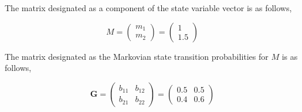 \documentclass{article}
\begin{document}
\noindent The matrix designated as a component of the state variable vector is as follows,

\begin{equation}
M=\begin{pmatrix}
m_1\\m_2
\end{pmatrix}=
\begin{pmatrix}
1\\1.5
\end{pmatrix}
\end{equation}

\noindent The matrix designated as the Markovian state transition probabilities for $M$ is as follows,

\begin{equation}
\mathbf{G}=\begin{pmatrix}
b_{11} & b_{12} \\
b_{21} & b_{22}
\end{pmatrix}=
\begin{pmatrix}
0.5 & 0.5 \\
0.4 & 0.6
\end{pmatrix}
\end{equation}
\end{document}
